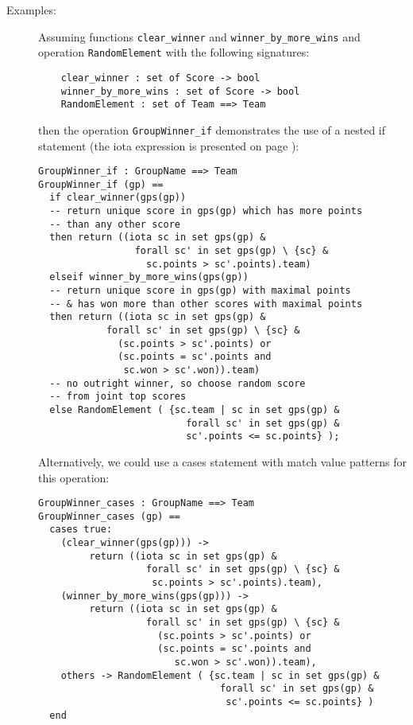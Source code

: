 \documentclass{overturerepchap}
\begin{document}
\begin{description}
\item[Examples:] Assuming functions \texttt{clear\_winner} and 
  \texttt{winner\_by\_more\_wins} and operation \texttt{RandomElement} 
  with the following signatures:
  \begin{lstlisting}
    clear_winner : set of Score -> bool
    winner_by_more_wins : set of Score -> bool
    RandomElement : set of Team ==> Team
  \end{lstlisting}
  then the operation \texttt{GroupWinner\_if} demonstrates the use of a 
  nested if statement (the iota expression is presented on page 
  \pageref{iotaexpr}):
  \begin{lstlisting}
GroupWinner_if : GroupName ==> Team
GroupWinner_if (gp) ==
  if clear_winner(gps(gp))
  -- return unique score in gps(gp) which has more points
  -- than any other score
  then return ((iota sc in set gps(gp) &
                 forall sc' in set gps(gp) \ {sc} &
                   sc.points > sc'.points).team)
  elseif winner_by_more_wins(gps(gp))
  -- return unique score in gps(gp) with maximal points
  -- & has won more than other scores with maximal points
  then return ((iota sc in set gps(gp) &
            forall sc' in set gps(gp) \ {sc} &
              (sc.points > sc'.points) or
              (sc.points = sc'.points and 
               sc.won > sc'.won)).team)
  -- no outright winner, so choose random score 
  -- from joint top scores
  else RandomElement ( {sc.team | sc in set gps(gp) &
                          forall sc' in set gps(gp) &
                          sc'.points <= sc.points} );
  \end{lstlisting}
  Alternatively, we could use a cases statement with match value patterns for
  this operation: 
  \begin{lstlisting}
GroupWinner_cases : GroupName ==> Team
GroupWinner_cases (gp) ==
  cases true:
    (clear_winner(gps(gp))) -> 
         return ((iota sc in set gps(gp) &
                   forall sc' in set gps(gp) \ {sc} &
                    sc.points > sc'.points).team),
    (winner_by_more_wins(gps(gp))) ->
         return ((iota sc in set gps(gp) &
                   forall sc' in set gps(gp) \ {sc} &
                     (sc.points > sc'.points) or
                     (sc.points = sc'.points and 
                        sc.won > sc'.won)).team),
    others -> RandomElement ( {sc.team | sc in set gps(gp) &
                                forall sc' in set gps(gp) &
                                 sc'.points <= sc.points} )
  end
  \end{lstlisting}

\end{description}
\end{document}
